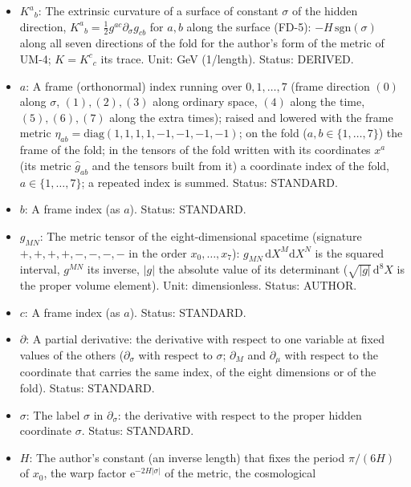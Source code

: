 \documentclass[
  10pt,
]{article}
\providecommand{\tightlist}{%
  \setlength{\itemsep}{0pt}\setlength{\parskip}{0pt}}
\begin{document}
\begin{itemize}
\tightlist
\item
  \(K^a{}_b\): The extrinsic curvature of a surface of constant
  \(\sigma\) of the hidden direction,
  \(K^a{}_b = \frac12 g^{ac}\partial_\sigma g_{cb}\) for \(a, b\) along
  the surface (FD-5): \(-H\,\mathrm{sgn}(\sigma)\) along all seven
  directions of the fold for the author's form of the metric of UM-4;
  \(K = K^c{}_c\) its trace. Unit: GeV (1/length). Status: DERIVED.
\item
  \(a\): A frame (orthonormal) index running over \(0, 1, \dots, 7\)
  (frame direction \((0)\) along \(\sigma\), \((1), (2), (3)\) along
  ordinary space, \((4)\) along the time, \((5), (6), (7)\) along the
  extra times); raised and lowered with the frame metric
  \(\eta_{ab} = \mathrm{diag}(1, 1, 1, 1, -1, -1, -1, -1)\); on the fold
  (\(a, b \in \{1, \dots, 7\}\)) the frame of the fold; in the tensors
  of the fold written with its coordinates \(x^a\) (its metric
  \(\hat g_{ab}\) and the tensors built from it) a coordinate index of
  the fold, \(a \in \{1, \dots, 7\}\); a repeated index is summed.
  Status: STANDARD.
\item
  \(b\): A frame index (as \(a\)). Status: STANDARD.
\item
  \(g_{MN}\): The metric tensor of the eight-dimensional spacetime
  (signature \(+,+,+,+,-,-,-,-\) in the order \(x_0, \dots, x_7\)):
  \(g_{MN}\,\mathrm{d}X^M\mathrm{d}X^N\) is the squared interval,
  \(g^{MN}\) its inverse, \(\lvert g\rvert\) the absolute value of its
  determinant (\(\sqrt{\lvert g\rvert}\,\mathrm{d}^8X\) is the proper
  volume element). Unit: dimensionless. Status: AUTHOR.
\item
  \(c\): A frame index (as \(a\)). Status: STANDARD.
\item
  \(\partial\): A partial derivative: the derivative with respect to one
  variable at fixed values of the others (\(\partial_\sigma\) with
  respect to \(\sigma\); \(\partial_M\) and \(\partial_\mu\) with
  respect to the coordinate that carries the same index, of the eight
  dimensions or of the fold). Status: STANDARD.
\item
  \(\sigma\): The label \(\sigma\) in \(\partial_\sigma\): the
  derivative with respect to the proper hidden coordinate \(\sigma\).
  Status: STANDARD.
\item
  \(H\): The author's constant (an inverse length) that fixes the period
  \(\pi/(6H)\) of \(x_0\), the warp factor
  \(\mathrm{e}^{-2H\lvert\sigma\rvert}\) of the metric, the cosmological

\end{itemize}
\end{document}
